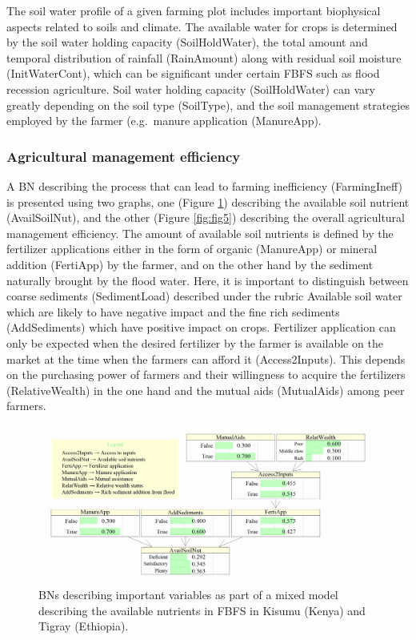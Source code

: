 \documentclass[12pt,oneside]{article}
\begin{document}
The soil water profile of a given farming plot includes important biophysical aspects related to soils and climate. The available water for crops is determined by the soil water holding capacity (SoilHoldWater), the total amount and temporal distribution of rainfall (RainAmount) along with residual soil moisture (InitWaterCont), which can be significant under certain FBFS such as flood recession agriculture. Soil water holding capacity (SoilHoldWater) can vary greatly depending on the soil type (SoilType), and the soil management strategies employed by the farmer (e.g.~manure application (ManureApp).

\hypertarget{II13}{%
\subsubsection{Agricultural management efficiency}\label{II13}}

A BN describing the process that can lead to farming inefficiency (FarmingIneff) is presented using two graphs, one (Figure \ref{fig:fig4}) describing the available soil nutrient (AvailSoilNut), and the other (Figure \ref{fig:fig5}) describing the overall agricultural management efficiency. The amount of available soil nutrients is defined by the fertilizer applications either in the form of organic (ManureApp) or mineral addition (FertiApp) by the farmer, and on the other hand by the sediment naturally brought by the flood water. Here, it is important to distinguish between coarse sediments (SedimentLoad) described under the rubric Available soil water which are likely to have negative impact and the fine rich sediments (AddSediments) which have positive impact on crops. Fertilizer application can only be expected when the desired fertilizer by the farmer is available on the market at the time when the farmers can afford it (Access2Inputs). This depends on the purchasing power of farmers and their willingness to acquire the fertilizers (RelativeWealth) in the one hand and the mutual aids (MutualAids) among peer farmers.

\begin{figure}[!htbp]

{\centering \includegraphics[width=1\linewidth,]{figures/Modelling_FBFS_Available_soil_Nutrients_BNs_plot} 

}

\caption{BNs describing important variables as part of a mixed model describing the available nutrients in FBFS in Kisumu (Kenya) and Tigray (Ethiopia).}\label{fig:fig4}
\end{figure}
\end{document}
